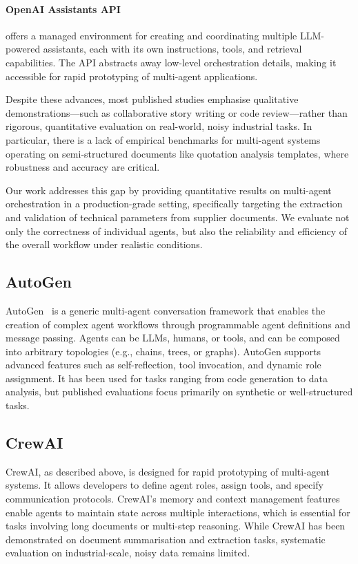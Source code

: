 \paragraph{OpenAI Assistants API} offers a managed environment for creating and coordinating multiple LLM-powered assistants, each with its own instructions, tools, and retrieval capabilities. The API abstracts away low-level orchestration details, making it accessible for rapid prototyping of multi-agent applications.

Despite these advances, most published studies emphasise qualitative demonstrations—such as collaborative story writing or code review—rather than rigorous, quantitative evaluation on real-world, noisy industrial tasks. In particular, there is a lack of empirical benchmarks for multi-agent systems operating on semi-structured documents like quotation analysis templates, where robustness and accuracy are critical.

Our work addresses this gap by providing quantitative results on multi-agent orchestration in a production-grade setting, specifically targeting the extraction and validation of technical parameters from supplier documents. We evaluate not only the correctness of individual agents, but also the reliability and efficiency of the overall workflow under realistic conditions.

\subsection{AutoGen}
AutoGen~\cite{wu2023autogen} is a generic multi-agent conversation framework that enables the creation of complex agent workflows through programmable agent definitions and message passing. Agents can be LLMs, humans, or tools, and can be composed into arbitrary topologies (e.g., chains, trees, or graphs). AutoGen supports advanced features such as self-reflection, tool invocation, and dynamic role assignment. It has been used for tasks ranging from code generation to data analysis, but published evaluations focus primarily on synthetic or well-structured tasks.

\subsection{CrewAI}
CrewAI, as described above, is designed for rapid prototyping of multi-agent systems. It allows developers to define agent roles, assign tools, and specify communication protocols. CrewAI's memory and context management features enable agents to maintain state across multiple interactions, which is essential for tasks involving long documents or multi-step reasoning. While CrewAI has been demonstrated on document summarisation and extraction tasks, systematic evaluation on industrial-scale, noisy data remains limited.

